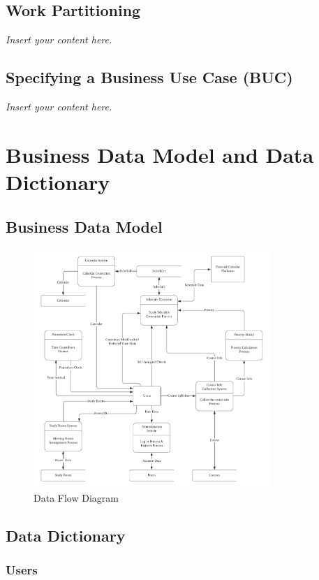\documentclass[12pt]{article}
\newcommand{\lips}{\textit{Insert your content here.}}
\begin{document}
\subsection{Work Partitioning}
\lips
\subsection{Specifying a Business Use Case (BUC)}
\lips

\section{Business Data Model and Data Dictionary}
\subsection{Business Data Model}
\begin{figure}[htbp]
  \centering
  \includegraphics[width=0.8\textwidth]{DFD.png}
  \caption{Data Flow Diagram} 
  \label{fig:dfd} 
\end{figure}

\subsection{Data Dictionary}
\subsubsection{Users}
\end{document}
